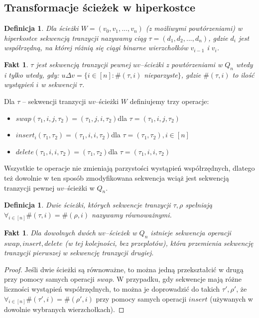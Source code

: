 \documentclass{pracamgr}
\newtheorem{defi}[theorem]{Definicja}
\newtheorem{fact}[theorem]{Fakt}
\begin{document}
  \subsection{Transformacje ścieżek w hiperkostce}
   \begin{defi}\label{sekwencja tranzycji}
     Dla ścieżki $W=(v_0,v_1,...,v_n)$ (z możliwymi powtórzeniami) w hiperkostce \emph{sekwencją tranzycji} nazywamy ciąg $\tau=(d_1,d_2,...,d_n)$,
     gdzie $d_i$ jest współrzędną, na której różnią się ciągi binarne wierzchołków $v_{i-1}$ i $v_i$.
    \end{defi}
    \begin{fact}\label{sekwencja tranzycji - parzystość}
     $\tau$ jest sekwencją tranzycji pewnej $uv$--ścieżki z powtórzeniami w $Q_n$ wtedy i tylko wtedy, gdy:\newline
     $u\Delta v=\{i\in[n]:\#(\tau,i)$ nieparzyste$\}$,
     gdzie $\#(\tau,i)$ to ilość wystąpień $i$ w sekwencji $\tau$.
    \end{fact}
    \noindent
    Dla $\tau$ -- sekwencji tranzycji $uv$--ścieżki $W$ definiujemy trzy operacje:
    \begin{itemize}
     \item $swap(\tau_1,i,j,\tau_2)=(\tau_1,j,i,\tau_2)$\quad dla $\tau=(\tau_1,i,j,\tau_2)$
     \item $insert_i(\tau_1,\tau_2)=(\tau_1,i,i,\tau_2)$\quad dla $\tau=(\tau_1,\tau_2),i\in[n]$
     \item $delete(\tau_1,i,i,\tau_2)=(\tau_1,\tau_2)$\quad dla $\tau=(\tau_1,i,i,\tau_2)$
    \end{itemize}
    Wszystkie te operacje nie zmieniają parzystości wystąpień współrzędnych, dlatego też dowolnie w ten sposób zmodyfikowana sekwencja
    wciąż jest sekwencją tranzycji pewnej $uv$--ścieżki w $Q_n$.
    \begin{defi}\label{sciezki rownowazne}
     Dwie ścieżki, których sekwencje tranzycji $\tau,\rho$ spełniają $\forall_{i\in[n]}\#(\tau,i)=\#(\rho,i)$ nazywamy \emph{równoważnymi}.
    \end{defi}
    \begin{fact}\label{przeksztalcanie sciezek}
     Dla dowolnych dwóch $uv$--ścieżek w $Q_n$ istnieje sekwencja operacji\newline
     $swap, insert, delete$ (w tej kolejności, bez przeplotów),
     która przemienia sekwencję tranzycji pierwszej w sekwencję tranzycji drugiej.
    \end{fact}
    \begin{proof}
     Jeśli dwie ścieżki są równoważne, to można jedną przekształcić w drugą przy pomocy samych operacji $swap$.\newline
     W przypadku, gdy sekwencje mają różne liczności wystąpień współrzędnych, to można je doprowadzić do takich $\tau',\rho'$,
     że $\forall_{i\in[n]}\#(\tau',i)=\#(\rho',i)$ przy pomocy samych operacji $insert$ (używanych w dowolnie wybranych wierzchołkach).
    \end{proof}
\end{document}
